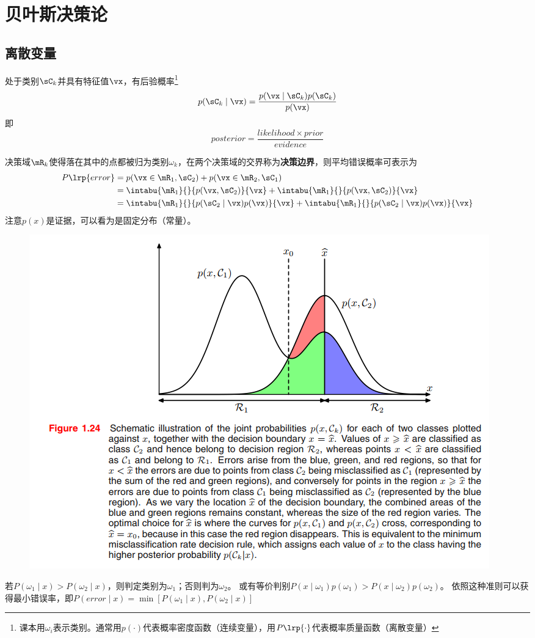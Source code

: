 
\section{贝叶斯决策论} %

\subsection{离散变量}
处于类别$\sC_k$并具有特征值$\vx$，有后验概率\footnote{课本用$\omega_i$表示类别。通常用$p(\cdot)$代表概率密度函数（连续变量），用$P\lrp{\cdot}$代表概率质量函数（离散变量）}
\[p(\sC_k\mid\vx)=\frac{p(\vx\mid\sC_k)p(\sC_k)}{p(\vx)}\]
即
\[posterior=\frac{likelihood\times prior}{evidence}\]

决策域$\mR_k$使得落在其中的点都被归为类别$\omega_k$，在两个决策域的交界称为\textbf{决策边界}，则平均错误概率可表示为
\[\begin{aligned}
P\lrp{error}&=p(\vx\in\mR_1,\sC_2)+p(\vx\in\mR_2,\sC_1)\\
&=\intabu{\mR_1}{}{p(\vx,\sC_2)}{\vx}+\intabu{\mR_1}{}{p(\vx,\sC_2)}{\vx}\\
&=\intabu{\mR_1}{}{p(\sC_2\mid\vx)p(\vx)}{\vx}+\intabu{\mR_1}{}{p(\sC_2\mid\vx)p(\vx)}{\vx}\\
\end{aligned}\]
注意$p(x)$是证据，可以看为是固定分布（常量）。

\begin{figure}[H]
\centering
\includegraphics[width=0.8\linewidth]{fig/bayesian_decision.png}
\end{figure}
\begin{theorem}
若$P(\omega_1\mid x)>P(\omega_2\mid x)$，则判定类别为$\omega_1$；否则判为$\omega_2$。
或有等价判别$P(x\mid \omega_1)p(\omega_1)>P(x\mid\omega_2)p(\omega_2)$。
依照这种准则可以获得最小错误率，即$P(error\mid x)=\min [P(\omega_1\mid x),P(\omega_2\mid x)]$
\end{theorem}

